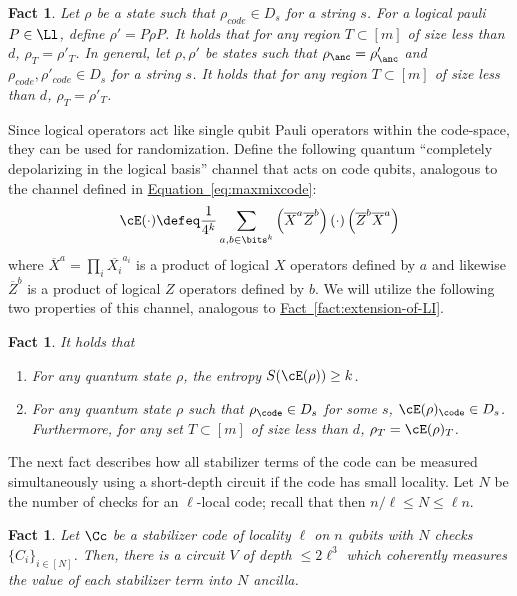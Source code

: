 \documentclass[11pt]{article}
\newcommand{\expref}[2]{\texorpdfstring{\hyperref[#2]{#1~\ref{#2}}}{#1~\ref{#2}}}
\newcommand{\expeqref}[2]{\texorpdfstring{\hyperref[#2]{#1~\eqref{#2}}}{#1~\eqref{#2}}}
\newtheorem{fact}[theorem]{Fact}
\begin{document}
\begin{fact}
\label{fact:samemarginals}
Let $\rho$ be a state such that $\rho_{code}\in D_s$ for a string $s$. For a logical pauli $P\in \Ll$, define $\rho'=P\rho P$. It holds that for any region $T\subset [m]$ of size less than $d$, $\rho_T=\rho'_T$.
In general, let $\rho, \rho'$ be states such that $\rho_{\anc}=\rho'_{\anc}$ and $\rho_{code}, \rho'_{code}\in D_s$ for a string $s$. It holds that for any region $T\subset [m]$ of size less than $d$, $\rho_T=\rho'_T$.
\end{fact}

%

Since logical operators act like single qubit Pauli operators within the code-space, they can be used for randomization. %
Define the following quantum ``completely depolarizing in the logical basis'' channel that acts on code qubits, analogous to the channel defined in \expeqref{Equation}{eq:maxmixcode}:
\begin{align}
\label{eq:randomizer}
\cE(\cdot) \defeq \frac{1}{4^{k}} \sum_{a,b \in \bits^{k}} \left( \overline{X}^a \overline{Z}^b \right)(\cdot)\left( \overline{Z}^b\overline{X}^a  \right)
%
\end{align}
where $\overline{X}^a = \prod_i \overline{X_i}^{a_i}$ is a product of logical $X$ operators defined by $a$ and likewise $\overline{Z}^b$ is a product of logical $Z$ operators defined by $b$.
%
We will utilize the following two properties of this channel, analogous to \expref{Fact}{fact:extension-of-LI}.
\begin{fact}
\label{fact:Eprop}
It holds that
\begin{enumerate}
    \item For any quantum state $\rho$, the entropy $S(\cE(\rho))\geq k$.
    \item For any quantum state $\rho$ such that $\rho_{\code}\in D_s$ for some $s$, $\cE(\rho)_{\code}\in D_s$. Furthermore, for any set $T\subset [m]$ of size less than $d$, $\rho_T=\cE(\rho)_T$.
\end{enumerate}
\end{fact}

The next fact describes how all stabilizer terms of the code can be measured simultaneously using a short-depth circuit if the code has small locality. Let $N$ be the number of checks for an $\ell$-local code; recall that then $n/\ell \leq N \leq \ell n$.

\begin{fact}
\label{fact:efficient_measurement}
Let $\Cc$ be a stabilizer code of locality $\ell$ on $n$ qubits with $N$ checks $\{C_i\}_{i \in [N]}$. Then, there is a circuit $V$ of depth $\leq 2 \ell^3$ which coherently measures the value of each stabilizer term into $N$ ancilla.
\end{fact}
\end{document}
